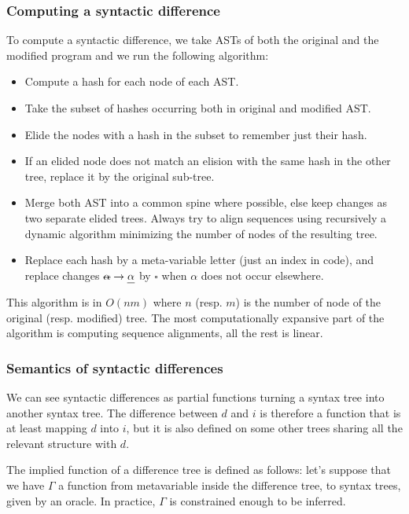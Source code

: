 \documentclass[a4paper,10pt]{article}
\begin{document}
\subsubsection{Computing a syntactic difference}
To compute a syntactic difference, we take ASTs of both the original and the modified program and we run the following algorithm:
\begin{itemize}
  \item Compute a hash for each node of each AST.
  \item Take the subset of hashes occurring both in original and modified AST.
  \item Elide the nodes with a hash in the subset to remember just their hash.
  \item If an elided node does not match an elision with the same hash in the other tree, replace it by the original sub-tree.
  \item Merge both AST into a common spine where possible, else keep changes as two separate elided trees. Always try to align sequences using recursively a dynamic algorithm minimizing the number of nodes of the resulting tree.
  \item Replace each hash by a meta-variable letter (just an index in code), and replace changes $\text{\st{$\alpha$}} \rightarrow \text{\ul{$\alpha$}}$ by $\square$ when $\alpha$ does not occur elsewhere.
\end{itemize}

This algorithm is in $O(nm)$ where $n$ (resp. $m$) is the number of node of the original (resp. modified) tree. The most computationally expansive part of the algorithm is computing sequence alignments, all the rest is linear.

\subsubsection{Semantics of syntactic differences}
We can see syntactic differences as partial functions turning a syntax tree into another syntax tree.
The difference between $d$ and $i$ is therefore a function that is at least mapping $d$ into $i$, but it is also defined on some other trees sharing all the relevant structure with $d$.

The implied function of a difference tree is defined as follows: let's suppose that we have $\Gamma$ a function from metavariable inside the difference tree, to syntax trees, given by an oracle. In practice, $\Gamma$ is constrained enough to be inferred.
\end{document}
